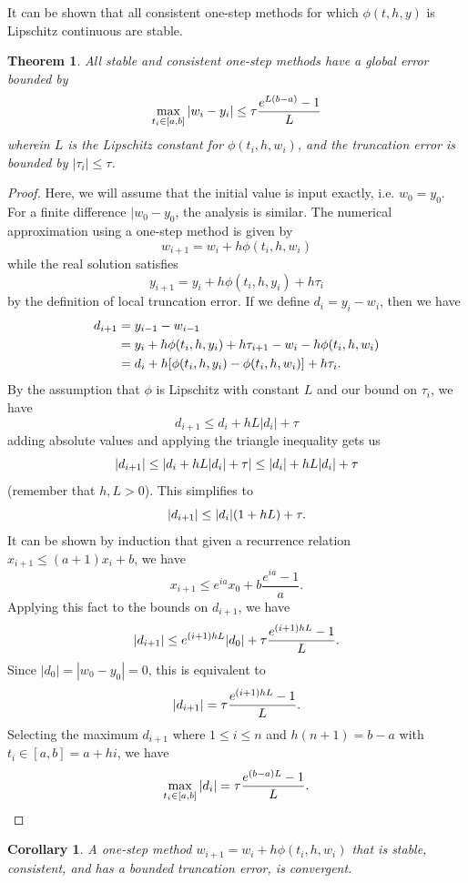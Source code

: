 \documentclass{article}
\newtheorem{theorem}{Theorem}[section]
\newtheorem{corollary}{Corollary}[section]
\newcommand{\0}{\vb{0}}
\begin{document}
It can be shown that all consistent one-step methods for which $\phi(t, h, y)$ is Lipschitz continuous are stable.

\begin{theorem}
  All stable and consistent one-step methods have a global error bounded by
  \[\max_{t_i \in [a, b]}\qty|w_i - y_i| \leq \tau\frac{e^{L(b-a)} - 1}{L}\]
  wherein $L$ is the Lipschitz constant for $\phi(t_i, h, w_i)$, and the truncation error is bounded by $|\tau_i| \leq \tau$.
\end{theorem}
\begin{proof}
  Here, we will assume that the initial value is input exactly, i.e. $w_0 = y_0$. For a finite difference $|w_0 - y_0$, the analysis is similar. The numerical approximation using a one-step method is given by
  \[w_{i+1} = w_i + h\phi(t_i, h, w_i)\]
  while the real solution satisfies
  \[y_{i+1} = y_i + h\phi(t_i, h, y_i) + h\tau_{i}\]
  by the definition of local truncation error. If we define $d_i = y_i - w_i$, then we have
  \begin{align*}
    d_{i+1} & = y_{i-1} - w_{i-1} \\
            & = y_i + h\phi(t_i, h, y_i) + h\tau_{i+1} - w_i - h\phi(t_i, h, w_i) \\
            & = d_i + h\qty[\phi(t_i, h, y_i) - \phi(t_i, h, w_i)] + h\tau_{i}.
  \end{align*}
  By the assumption that $\phi$ is Lipschitz with constant $L$ and our bound on $\tau_{i}$, we have
  \[d_{i+1} \leq d_i + hL|d_i| + \tau\]
  adding absolute values and applying the triangle inequality gets us
  \[\qty|d_{i+1}| \leq \qty|d_i + hL|d_i| + \tau| \leq |d_i| + hL|d_i| + \tau\]
  (remember that $h, L > 0$). This simplifies to
  \[\qty|d_{i+1}| \leq |d_i|(1+hL) + \tau.\]
  It can be shown by induction that given a recurrence relation $x_{i+1} \leq (a+1)x_i + b$, we have
  \[x_{i+1} \leq e^{ia}x_0 + b\frac{e^{ia} - 1}{a}.\]
  Applying this fact to the bounds on $d_{i+1}$, we have
  \[\qty|d_{i+1}| \leq e^{(i+1)hL}|d_0| + \tau\frac{e^{(i+1)hL} - 1}{L}.\]
  Since $|d_0| = |w_0 - y_0| = 0$, this is equivalent to
  \[\qty|d_{i+1}| = \tau\frac{e^{(i+1)hL} - 1}{L}.\]
  Selecting the maximum $d_{i+1}$ where $1 \leq i \leq n$ and $h(n+1) = b-a$ with $t_i \in [a, b] = a + hi$, we have
  \[\max_{t_i \in [a, b]}\qty|d_{i}| = \tau\frac{e^{(b-a)L} - 1}{L}.\qedhere\]
\end{proof}
\begin{corollary}
  A one-step method $w_{i+1} = w_i + h\phi(t_i, h, w_i)$ that is stable, consistent, and has a bounded truncation error, is convergent.
\end{corollary}
\end{document}
